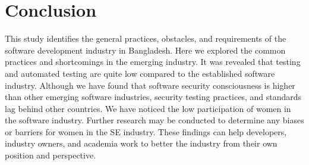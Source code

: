\section{Conclusion}
\label{conclusion}

This study identifies the general practices, obstacles, and requirements of the software development industry in Bangladesh. Here we explored the common practices and shortcomings in the emerging industry. It was revealed that testing and automated testing are quite low compared to the established software industry. Although we have found that software security consciousness is higher than other emerging software industries, security testing practices, and standards lag behind other countries. We have noticed the low participation of women in the software industry. Further research may be conducted to determine any biases or barriers for women in the SE industry. These findings can help developers, industry owners, and academia work to better the industry from their own position and perspective.